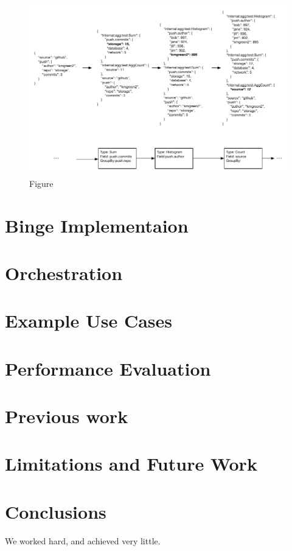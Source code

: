 \documentclass[10pt,twocolumn]{article}
\begin{document}
\begin{figure}
\centering
\includegraphics{figures/aggregation.pdf}
\caption{Figure}
\label{fig:aggregation}
\end{figure}


\section{Binge Implementaion}\label{binge:implementation}
\section{Orchestration}\label{sec:orchestration}
\section{Example Use Cases}\label{usecases}
\section{Performance Evaluation}\label{evaluation}
\section{Previous work}\label{previous:work}
\section{Limitations and Future Work}\label{future:work}
\section{Conclusions}\label{conclusions}
We worked hard, and achieved very little.



\end{document}
